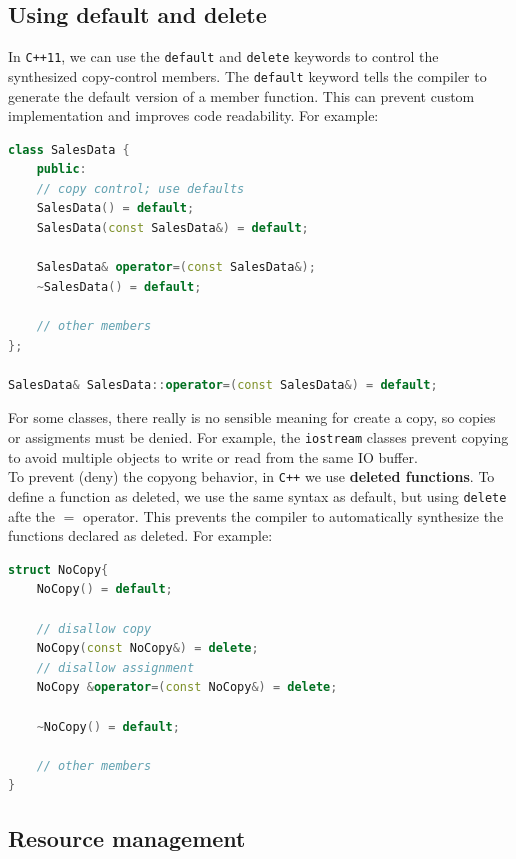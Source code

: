 \subsection{Using default and delete}

In \texttt{C++11}, we can use the \texttt{default} and \texttt{delete} keywords to control
the synthesized copy-control members. The \texttt{default} keyword tells the compiler to
generate the default version of a member function. This can prevent custom implementation
and improves code readability. For example:\\

\begin{lstlisting}[language=C++]
class SalesData {
    public: 
    // copy control; use defaults
    SalesData() = default;
    SalesData(const SalesData&) = default;

    SalesData& operator=(const SalesData&);
    ~SalesData() = default;

    // other members
};

SalesData& SalesData::operator=(const SalesData&) = default;
\end{lstlisting}

For some classes, there really is no sensible meaning for create a copy, so copies or
assigments must be denied. For example, the \texttt{iostream} classes prevent copying 
to avoid multiple objects to write or read from the same IO buffer.\\

To prevent (deny) the copyong behavior, in \texttt{C++} we use \textbf{deleted functions}.
To define a function as deleted, we use the same syntax as default, but using \texttt{delete}
afte the $=$ operator. This prevents the compiler to automatically synthesize the functions
declared as deleted. For example:\\

\begin{lstlisting}[language=C++]
struct NoCopy{
    NoCopy() = default;

    // disallow copy
    NoCopy(const NoCopy&) = delete;
    // disallow assignment
    NoCopy &operator=(const NoCopy&) = delete;

    ~NoCopy() = default;

    // other members
}
\end{lstlisting}

\subsection{Resource management}

